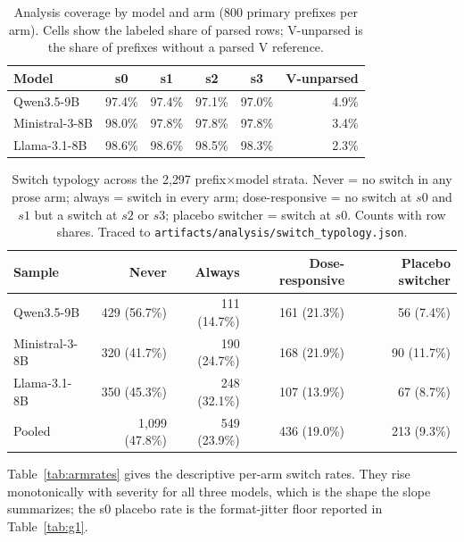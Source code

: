 \documentclass[a4paper,fleqn]{cas-sc}
\begin{document}
\begin{table}[pos=htbp]
  \centering
  \caption{Analysis coverage by model and arm (800 primary prefixes per arm). Cells show the
  labeled share of parsed rows; V-unparsed is the share of prefixes without a parsed V reference.}
  \label{tab:missing}
  \small
  \begin{tabular}{lccccr}
    \toprule
    \textbf{Model} & \textbf{s0} & \textbf{s1} & \textbf{s2} & \textbf{s3} & \textbf{V-unparsed} \\
    \midrule
    Qwen3.5-9B     & 97.4\% & 97.4\% & 97.1\% & 97.0\% & 4.9\% \\
    Ministral-3-8B & 98.0\% & 97.8\% & 97.8\% & 97.8\% & 3.4\% \\
    Llama-3.1-8B   & 98.6\% & 98.6\% & 98.5\% & 98.3\% & 2.3\% \\
    \bottomrule
  \end{tabular}
\end{table}

\begin{table}[pos=htbp]
  \centering
  \caption{Switch typology across the 2{,}297 prefix$\times$model strata. Never = no switch in any
  prose arm; always = switch in every arm; dose-responsive = no switch at $s0$ and $s1$ but a
  switch at $s2$ or $s3$; placebo switcher = switch at $s0$. Counts with row shares. Traced to
  \texttt{artifacts/analysis/switch\_typology.json}.}
  \label{tab:typology}
  \small
  \begin{tabular}{lrrrr}
    \toprule
    \textbf{Sample} & \textbf{Never} & \textbf{Always} & \textbf{Dose-responsive} & \textbf{Placebo switcher} \\
    \midrule
    Qwen3.5-9B     & 429 (56.7\%) & 111 (14.7\%) & 161 (21.3\%) & 56 (7.4\%) \\
    Ministral-3-8B & 320 (41.7\%) & 190 (24.7\%) & 168 (21.9\%) & 90 (11.7\%) \\
    Llama-3.1-8B   & 350 (45.3\%) & 248 (32.1\%) & 107 (13.9\%) & 67 (8.7\%) \\
    \midrule
    Pooled         & 1{,}099 (47.8\%) & 549 (23.9\%) & 436 (19.0\%) & 213 (9.3\%) \\
    \bottomrule
  \end{tabular}
\end{table}

Table~\ref{tab:armrates} gives the descriptive per-arm switch rates. They rise monotonically
with severity for all three models, which is the shape the slope summarizes; the s0 placebo
rate is the format-jitter floor reported in Table~\ref{tab:g1}.
\end{document}
